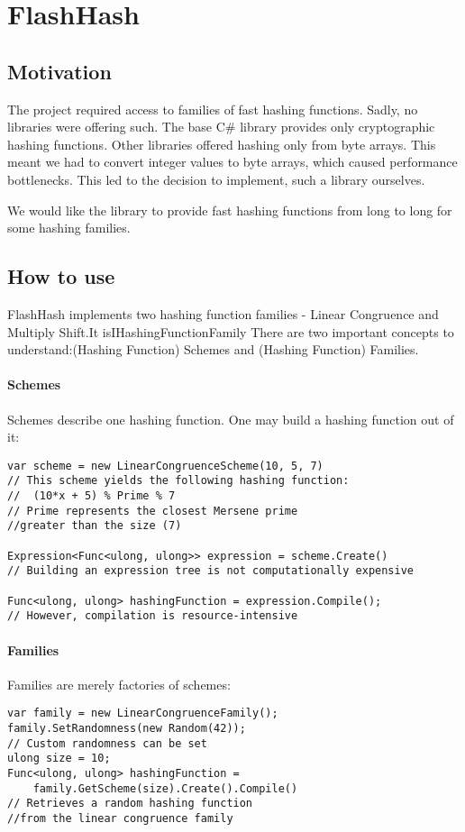 \chapter{FlashHash}
\section{Motivation}
The project required access to families of fast hashing functions. Sadly, no libraries were offering such. The base C\# library provides only cryptographic hashing functions. Other libraries offered hashing only from byte arrays. This meant we had to convert integer values to byte arrays, which caused performance bottlenecks. This led to the decision to implement, such a library ourselves.

We would like the library to provide fast hashing functions from long to long for some hashing families.

\section{How to use}
FlashHash implements two hashing function families - Linear Congruence and Multiply Shift.It isIHashingFunctionFamily
There are two important concepts to understand:(Hashing Function) Schemes and (Hashing Function) Families. 
\subsubsection{Schemes}
Schemes describe one hashing function. One may build a hashing function out of it:
\begin{lstlisting}
var scheme = new LinearCongruenceScheme(10, 5, 7)
// This scheme yields the following hashing function:
//  (10*x + 5) % Prime % 7
// Prime represents the closest Mersene prime 
//greater than the size (7)

Expression<Func<ulong, ulong>> expression = scheme.Create()
// Building an expression tree is not computationally expensive

Func<ulong, ulong> hashingFunction = expression.Compile();
// However, compilation is resource-intensive
\end{lstlisting}

\subsubsection{Families}
Families are merely factories of schemes:
\begin{lstlisting}
var family = new LinearCongruenceFamily();
family.SetRandomness(new Random(42));
// Custom randomness can be set
ulong size = 10;
Func<ulong, ulong> hashingFunction = 
    family.GetScheme(size).Create().Compile()
// Retrieves a random hashing function 
//from the linear congruence family
\end{lstlisting}



